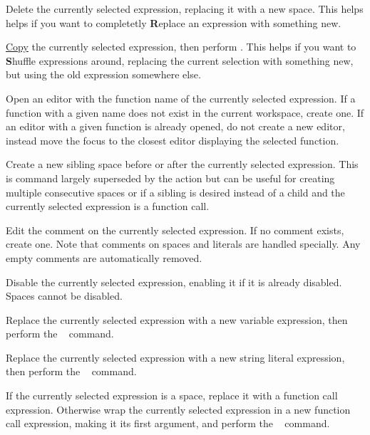 Delete the currently selected expression, replacing it with a new space. This
helps helps if you want to completetly \textbf{R}eplace an expression with
something new.

\hyperref[cmd:copy]{Copy} the currently selected expression, then perform
\hyperref[cmd:delete_blank]{}. This helps if you want
to \textbf{S}huffle expressions around, replacing the current selection with
something new, but using the old expression somewhere else.

Open an editor with the function name of the currently selected expression.
If a function with a given name does not exist in the current workspace,
create one.
If an editor with a given function is already opened, do not create a new editor,
instead move the focus to the closest editor displaying the selected function.


Create a new sibling space before or after the currently selected
expression. This is command largely superseded by the
\hyperref[cmd:smart_space]{} \keys{\SPACE} action but can be
useful for creating multiple consecutive spaces or if a sibling is desired
instead of a child and the currently selected expression is a function call.

Edit the comment on the currently selected expression. If no comment exists,
create one. Note that comments on spaces and literals are handled
specially. Any empty comments are automatically removed.

Disable the currently selected expression, enabling it if it is already
disabled. Spaces cannot be disabled.

Replace the currently selected expression with a new variable expression, then
perform the \hyperref[cmd:edit]{}~\keys{\return} command.

Replace the currently selected expression with a new string literal
expression, then
perform the \hyperref[cmd:edit]{}~\keys{\return} command.

If the currently selected expression is a space, replace it with a function
call expression. Otherwise wrap the currently selected expression in a new
function call expression, making it its first argument, and perform
the \hyperref[cmd:edit]{}~\keys{\return} command.

